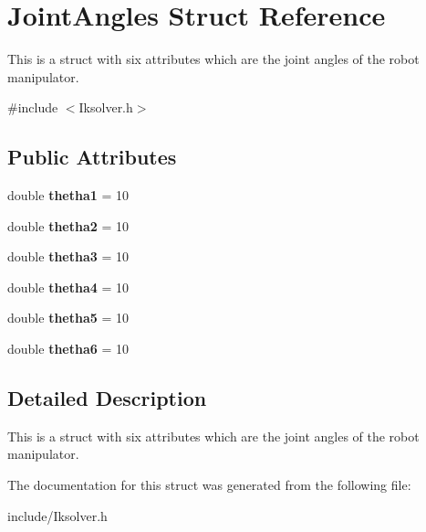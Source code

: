\hypertarget{structJointAngles}{}\section{Joint\+Angles Struct Reference}
\label{structJointAngles}


This is a struct with six attributes which are the joint angles of the robot manipulator.  




{\ttfamily \#include $<$Iksolver.\+h$>$}

\subsection*{Public Attributes}
\begin{DoxyCompactItemize}
\item 
double {\bfseries thetha1} = 10\hypertarget{structJointAngles_a25ef8e13ef8babc95e27fb7004692f9a}{}\label{structJointAngles_a25ef8e13ef8babc95e27fb7004692f9a}

\item 
double {\bfseries thetha2} = 10\hypertarget{structJointAngles_acf0d666376d537675ab8f093e4e0676e}{}\label{structJointAngles_acf0d666376d537675ab8f093e4e0676e}

\item 
double {\bfseries thetha3} = 10\hypertarget{structJointAngles_ab6e6bd7a72a2c5c15e09823f717eda82}{}\label{structJointAngles_ab6e6bd7a72a2c5c15e09823f717eda82}

\item 
double {\bfseries thetha4} = 10\hypertarget{structJointAngles_af5b00557e096dd9f21d4038dd4b008ba}{}\label{structJointAngles_af5b00557e096dd9f21d4038dd4b008ba}

\item 
double {\bfseries thetha5} = 10\hypertarget{structJointAngles_ace9588d1858f90e2f31afde1e05aece4}{}\label{structJointAngles_ace9588d1858f90e2f31afde1e05aece4}

\item 
double {\bfseries thetha6} = 10\hypertarget{structJointAngles_a3a3ed376b7354d1def6fd5ea7d909c67}{}\label{structJointAngles_a3a3ed376b7354d1def6fd5ea7d909c67}

\end{DoxyCompactItemize}


\subsection{Detailed Description}
This is a struct with six attributes which are the joint angles of the robot manipulator. 

The documentation for this struct was generated from the following file\+:\begin{DoxyCompactItemize}
\item 
include/Iksolver.\+h\end{DoxyCompactItemize}
